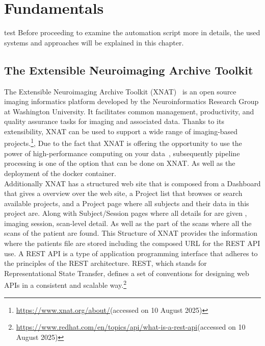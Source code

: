 
\chapter{Fundamentals}
test
Before proceeding to examine the automation script more in details, the used systems and approaches will be explained in this chapter.

\section{The Extensible Neuroimaging Archive Toolkit}
The Extensible Neuroimaging Archive Toolkit (XNAT)~\cite{marcus_extensible_2007} is an open source imaging informatics platform developed by the Neuroinformatics Research Group at Washington University. It facilitates common management, productivity, and quality assurance tasks for imaging and associated data. Thanks to its extensibility, XNAT can be used to support a wide range of imaging-based projects.\footnote{\url{https://www.xnat.org/about/}(accessed on 10 August 2025)}, Due to the fact that XNAT is offering the opportunity to use the power of high-performance computing on your data~\cite{zaschke_extending_2024}, 
subsequently pipeline processing is one of the option that can be done on XNAT. As well as the deployment of the docker container.
\\
Additionally XNAT has a structured web site that is composed from a Dashboard that gives a overview over the web site, a Project list that browses or search available projects, and a Project page where all subjects and their data in this project are. Along with Subject/Session pages where all details for are given , imaging session, scan-level detail.
As well as the part of the scans where all the scans of the patient are found. 
This Structure of XNAT provides the information where the patients file are stored including the composed URL for the REST API use. A REST API is a type of application programming interface that adheres to the principles of the REST architecture. REST, which stands for Representational State Transfer, defines a set of conventions for designing web APIs in a consistent and scalable way.\footnote{\url{https://www.redhat.com/en/topics/api/what-is-a-rest-api}(accessed on 10 August 2025)}
\\
